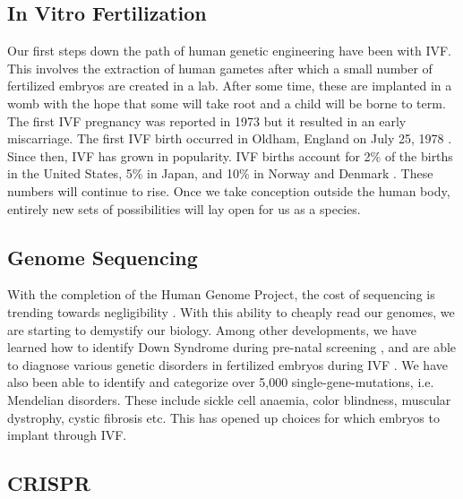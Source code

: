 \subsection{In Vitro Fertilization}

Our first steps down the path of human genetic engineering have been with IVF.
This involves the extraction of human gametes after which a small number of fertilized embryos are created in a lab.
After some time, these are implanted in a womb with the hope that some will take root and a child will be borne to term.
The first IVF pregnancy was reported in 1973 \cite{Kretzer1973} but it resulted in an early miscarriage.
The first IVF birth occurred in Oldham, England on July 25, 1978 \cite{Steptoe1978}.
Since then, IVF has grown in popularity.
IVF births account for 2\% of the births in the United States, 5\% in Japan, and 10\% in Norway and Denmark \cite{Metzl2019}.
These numbers will continue to rise.
Once we take conception outside the human body, entirely new sets of possibilities will lay open for us as a species.

\subsection{Genome Sequencing}

With the completion of the Human Genome Project, the cost of sequencing is trending towards negligibility \cite{Wetterstrand2019}.
With this ability to cheaply read our genomes, we are starting to demystify our biology.
Among other developments, we have learned how to identify Down Syndrome during pre-natal screening \cite{Natoli2012}, and are able to diagnose various genetic disorders in fertilized embryos during IVF \cite{Rycke2017}.
We have also been able to identify and categorize over 5,000 single-gene-mutations, i.e. Mendelian disorders.
These include sickle cell anaemia, color blindness, muscular dystrophy, cystic fibrosis etc.
This has opened up choices for which embryos to implant through IVF.

\subsection{CRISPR}


